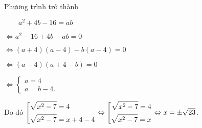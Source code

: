 \begin{ex}
{\begin{enumerate}
    Phương trình trở thành 
    
    $\qquad a^2+4b-16=ab$
    
    $\Leftrightarrow a^2-16+4b-ab=0$
    
    $\Leftrightarrow (a+4)(a-4)-b(a-4)=0$
    
    $\Leftrightarrow (a-4)(a+4-b)=0$
    
    $\Leftrightarrow \begin{cases}
    a=4 \\ a=b-4.
    \end{cases}$
    
    Do đó $\left[\begin{aligned}&
    \sqrt{x^2-7}=4 \\ &\sqrt{x^2-7}=x+4-4
    \end{aligned}\right. \Leftrightarrow \left[\begin{aligned}\sqrt{x^2-7}=4 \\ \sqrt{x^2-7}=x\end{aligned}\right. \Leftrightarrow x= \pm \sqrt{23}$.
	\end{enumerate} 
    }
\end{ex}

